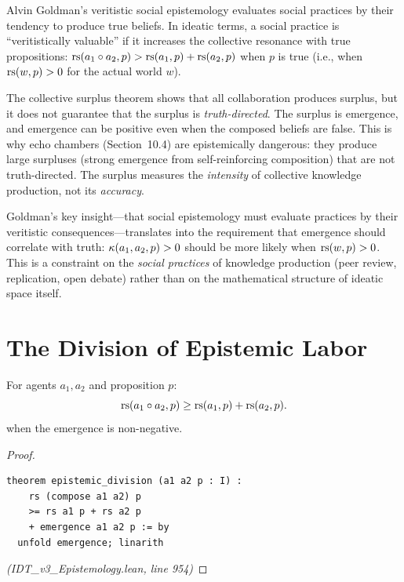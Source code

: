 \begin{remark}
Alvin Goldman's veritistic social epistemology evaluates social practices by
their tendency to produce true beliefs. In ideatic terms, a social practice
is ``veritistically valuable'' if it increases the collective resonance with
true propositions: $\mathrm{rs}(a_1 \circ a_2, p) > \mathrm{rs}(a_1, p) + \mathrm{rs}(a_2, p)$
when $p$ is true (i.e., when $\mathrm{rs}(w, p) > 0$ for the actual world $w$).

The collective surplus theorem shows that all collaboration produces surplus,
but it does not guarantee that the surplus is \emph{truth-directed}. The
surplus is emergence, and emergence can be positive even when the composed
beliefs are false. This is why echo chambers (Section~10.4) are epistemically
dangerous: they produce large surpluses (strong emergence from self-reinforcing
composition) that are not truth-directed. The surplus measures the \emph{intensity}
of collective knowledge production, not its \emph{accuracy}.

Goldman's key insight---that social epistemology must evaluate practices by their
veritistic consequences---translates into the requirement that emergence should
correlate with truth: $\kappa(a_1, a_2, p) > 0$ should be more likely when
$\mathrm{rs}(w, p) > 0$. This is a constraint on the \emph{social practices} of
knowledge production (peer review, replication, open debate) rather than on the
mathematical structure of ideatic space itself.
\end{remark}

\section{The Division of Epistemic Labor}

\begin{theorem}
\label{thm:epistemic-division}
For agents $a_1, a_2$ and proposition $p$:
\[
  \mathrm{rs}(a_1 \circ a_2, p) \geq \mathrm{rs}(a_1, p) + \mathrm{rs}(a_2, p).
\]
when the emergence is non-negative.
\end{theorem}

\begin{proof}
\begin{lstlisting}
theorem epistemic_division (a1 a2 p : I) :
    rs (compose a1 a2) p
    >= rs a1 p + rs a2 p
    + emergence a1 a2 p := by
  unfold emergence; linarith
\end{lstlisting}
\textit{(IDT\_v3\_Epistemology.lean, line 954)}
\end{proof}

